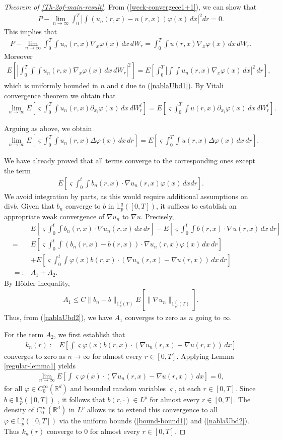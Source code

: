 \documentclass[12pt,oneside, reqno]{amsart}
\newcommand{\ce}{\begin{eqnarray*}}
\newcommand{\de}{\end{eqnarray*}}
\def\mL{{\mathbb L}}
\def\mR{{\mathbb R}}
\def\leq{\leqslant}
\numberwithin{equation}{section}
\begin{document}
\begin{proof}[Theorem of \ref{Th-2of-main-result}]
From (\ref{weck-convergece1+1}), we can show that 
\ce 
P-\lim_{n\to\infty}\int_0^T\left|\int (u_n(r,x)-u(r,x))\varphi(x)\,dx\right|^2dr=0.
\de 
This implies that 
\ce 
P-\lim_{n\to\infty}\int_0^T\int  u_n(r,x)\nabla_x\varphi(x)\,dx\,dW_r=\int_0^T\int  u(r,x)\nabla_x\varphi(x)\,dx\,dW_r.
\de 
 Moreover 
\ce 
E\left[\left|\int_0^T\int \int u_n(r,x)\nabla_x\varphi(x)\,dx\,dW_r\right|^2\right]=E\left[\int_0^T\left|\int \int u_n(r,x)\nabla_x\varphi(x)\,dx\right|^2\,dr\right],
\de 
which is uniformly bounded in $n$ and $t$ due to  (\ref{nablaUbd1}).  By Vitali convergence theorem we obtain that 
\ce 
\lim_{n\to \infty}E\left[\varsigma\int_0^T\int u_n(r,x)\partial_{x_i}\varphi(x)\,dx\,dW_r^i\right]=E\left[\varsigma\int_0^T\int  u(r,x)\partial_{x_i}\varphi(x)\,dx\,dW_r^i\right].
\de 

Arguing as above, we obtain
\ce 
\lim_{n\to\infty}E\left[\varsigma\int_0^T \int u_n(r,x)\Delta\varphi(x)\,dx\,dr\right]=E\left[\varsigma\int_0^T \int u(r,x)\Delta\varphi(x)\,dx\,dr\right].
\de 

We have already proved that all terms converge to the corresponding ones except the term 
\ce 
E\left[\varsigma\int_0^t\int b_n(r,x)\cdot \nabla u_n(r,x) \varphi(x)\, dx dr\right].
\de 
We avoid integration by parts, as this would require additional assumptions on $\mbox{div} b$. Given that $b_n$ converge to $b$ in $\mL_p^q([0,T])$, it suffices to establish an appropriate weak convergence of 
 $\nabla u_n$  to $\nabla u$. Precisely,
\ce 
&&E\left[\varsigma\int_0^t\int b_n(r,x)\cdot \nabla u_n(r,x)\,dx\,dr\right]-E\left[\varsigma\int_0^t\int b(r,x)\cdot \nabla u(r,x)\,dx\,dr\right]\\
&=&E\left[\varsigma\int_0^t\int(b_n(r,x)-b(r,x))\cdot \nabla u_n(r,x)\varphi(x)\,dx\,dr\right]\\
&&+E\left[\varsigma\int_0^t\int \varphi(x)b(r,x)\cdot (\nabla u_n(r,x)-\nabla u(r,x))\,dx\,dr\right]\\
&=:&A_1+A_2.
\de 
By H\"{o}lder inequality, 
\ce 
A_1\leq C\|b_n-b\|_{\mL_p^q(T)}E[\|\nabla u_n\|_{\mL_{p^*}^{q^*}(T)}].
\de 
Thus, from (\ref{nablaUbd2}), we have $A_1$ converges to zero as $n$ going to $\infty$.


For the term $A_2$, we first establish that 
\ce 
k_n(r):=E\left[\int \varsigma \varphi(x)b(r,x)\cdot (\nabla u_n(r,x)-\nabla u(r,x)) \,dx\right]
\de 
converges to zero as $n\to \infty$ for almost every $r\in [0,T]$. Applying Lemma \ref{regular-lemma1} yields 
\ce 
\lim_{n\to \infty}E\left[\int \varsigma \varphi(x)\cdot (\nabla u_n(r,x)-\nabla u(r,x)) \,dx\right]=0,
\de 
for all $\varphi\in C_0^{\infty}(\mR^d)$ and bounded random variables 
 $\varsigma$, at each $r\in [0,T]$. Since $b\in\mL_p^q([0,T])$ , it follows that $b(r,\cdot)\in L^p$ for almost every $r\in[0,T]$. The density of $C_0^{\infty}(\mR^d)$  in $L^p$ allows us to extend this convergence to all $\varphi\in \mL_p^q([0,T])$ via the uniform bounds (\ref{bound-bound1})  and (\ref{nablaUbd2}). Thus $k_n(r)$ converge to $0$ for almost every $r\in [0,T]$.


\end{proof}
\end{document}
